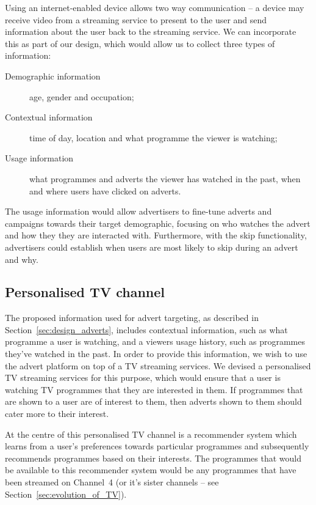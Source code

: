 	Using an internet-enabled device allows two way communication -- a device may receive video from a streaming service to present to the user and send information about the user back to the streaming service. We can incorporate this as part of our design, which would allow us to collect three types of information:
	\begin{description}
	\item[Demographic information] age, gender and occupation;
	\item[Contextual information] time of day, location and what programme the viewer is watching;
	\item[Usage information] what programmes and adverts the viewer has watched in the past, when and where users have clicked on adverts.
	\end{description}

	The usage information would allow advertisers to fine-tune adverts and campaigns towards their target demographic, focusing on who watches the advert and how they they are interacted with. Furthermore, with the skip functionality, advertisers could establish when users are most likely to skip during an advert and why.

\subsection{Personalised TV channel}

	The proposed information used for advert targeting, as described in Section~\ref{sec:design_adverts}, includes contextual information, such as what programme a user is watching, and a viewers usage history, such as programmes they've watched in the past. In order to provide this information, we wish to use the advert platform on top of a TV streaming services. We devised a personalised TV streaming services for this purpose, which would ensure that a user is watching TV programmes that they are interested in them. If programmes that are shown to a user are of interest to them, then adverts shown to them should cater more to their interest.

	At the centre of this personalised TV channel is a recommender system which learns from a user's preferences towards particular programmes and subsequently recommends programmes based on their interests. The programmes that would be available to this recommender system would be any programmes that have been streamed on Channel~4 (or it's sister channels -- see Section~\ref{sec:evolution_of_TV}).

